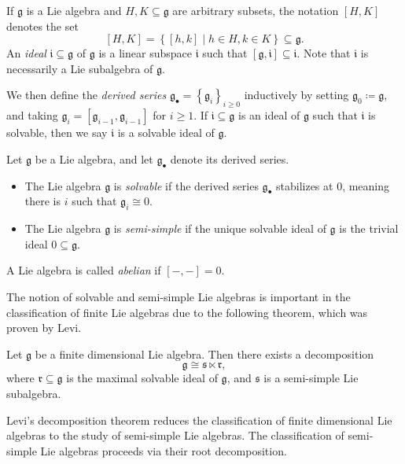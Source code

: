 \documentclass[11pt, letterpaper]{article}
\theoremstyle{plain}
\begin{document}
If $\mathfrak{g} $ is a Lie algebra and $H,K \subseteq \mathfrak{g} $ are arbitrary subsets, the notation $[H,K]$ denotes the set
\[
	[H,K] = \left\{ [h,k] \mid h\in H,k\in K \right\} \subseteq \mathfrak{g} 
.\]
An \emph{ideal} $\mathfrak{i} \subseteq \mathfrak{g} $ of $\mathfrak{g} $ is a linear subspace $\mathfrak{i} $ such that $[\mathfrak{g} ,\mathfrak{i} ]\subseteq \mathfrak{i} $. Note that $\mathfrak{i} $ is necessarily a Lie subalgebra of $\mathfrak{g} $.

We then define the \emph{derived series} $\mathfrak{g} _{\bullet} =\left\{ \mathfrak{g}_i \right\} _{i\geq 0} $ inductively by setting $\mathfrak{g}_0 \coloneqq \mathfrak{g} $, and taking $\mathfrak{g} _i = [\mathfrak{g} _{i-1} ,\mathfrak{g} _{i-1} ]$ for $i\geq 1$. If $\mathfrak{i} \subseteq \mathfrak{g} $ is an ideal of $\mathfrak{g} $ such that $\mathfrak{i} $ is solvable, then we say $\mathfrak{i} $ is a solvable ideal of $\mathfrak{g} $.
\begin{definition}\label{dfn:2-2}
	Let $\mathfrak{g} $ be a Lie algebra, and let $\mathfrak{g} _{\bullet} $ denote its derived series.
	\begin{itemize}
		\item The Lie algebra $\mathfrak{g} $ is \emph{solvable} if the derived series $\mathfrak{g} _{\bullet} $ stabilizes at 0, meaning there is $i$ such that $\mathfrak{g} _i\cong 0$.
		\item The Lie algebra $\mathfrak{g} $ is \emph{semi-simple} if the unique solvable ideal of $\mathfrak{g} $ is the trivial ideal $0\subseteq \mathfrak{g} $.
	\end{itemize}
	A Lie algebra is called \emph{abelian} if $[-,-]=0$.
\end{definition}

The notion of solvable and semi-simple Lie algebras is important in the classification of finite Lie algebras due to the following theorem, which was proven by Levi.

\begin{theorem}\label{thm:2-3}
	Let $\mathfrak{g} $ be a finite dimensional Lie algebra. Then there exists a decomposition
	\[
		\mathfrak{g} \cong \mathfrak{s} \ltimes \mathfrak{r} 
	,\]
	where $\mathfrak{r} \subseteq \mathfrak{g} $ is the maximal solvable ideal of $\mathfrak{g} $, and $\mathfrak{s} $ is a semi-simple Lie subalgebra.
\end{theorem}

Levi's decomposition theorem reduces the classification of finite dimensional Lie algebras to the study of semi-simple Lie algebras. The classification of semi-simple Lie algebras proceeds via their root decomposition.
\end{document}

